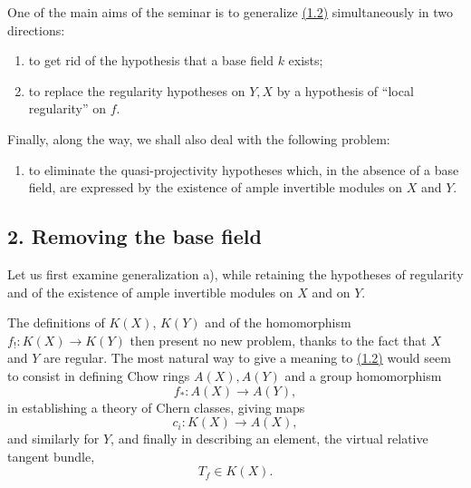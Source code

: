 One of the main aims of the seminar is to generalize \hyperlink{sga6.e00.eq.1-2}{(1.2)} simultaneously in two directions:
\begin{enumerate}[label=\alph*)]
\item to get rid of the hypothesis that a base field $k$ exists;
\item to replace the regularity hypotheses on $Y,X$ by a hypothesis of ``local regularity'' on $f$.
\end{enumerate}
Finally, along the way, we shall also deal with the following problem:
\begin{enumerate}[label=\alph*),start=3]
\item to eliminate the quasi-projectivity hypotheses which, in the absence of a base field, are expressed by the existence of ample invertible modules on $X$ and $Y$.
\end{enumerate}

\subsection*{2. Removing the base field}
Let us first examine generalization a), while retaining the hypotheses of regularity and of the existence of ample invertible modules on $X$ and on $Y$.

The definitions of $K(X)$, $K(Y)$ and of the homomorphism $f_!:K(X)\to K(Y)$ then present no new problem, thanks to the fact that $X$ and $Y$ are regular. The most natural way to give a meaning to \hyperlink{sga6.e00.eq.1-2}{(1.2)} would seem to consist in defining Chow rings $A(X),A(Y)$ and a group homomorphism
\[
f_*:A(X)\longrightarrow A(Y),
\]
in establishing a theory of Chern classes, giving maps
\[
c_i:K(X)\longrightarrow A(X),
\]
and similarly for $Y$, and finally in describing an element, the virtual relative tangent bundle,
\[
T_f\in K(X).
\]

